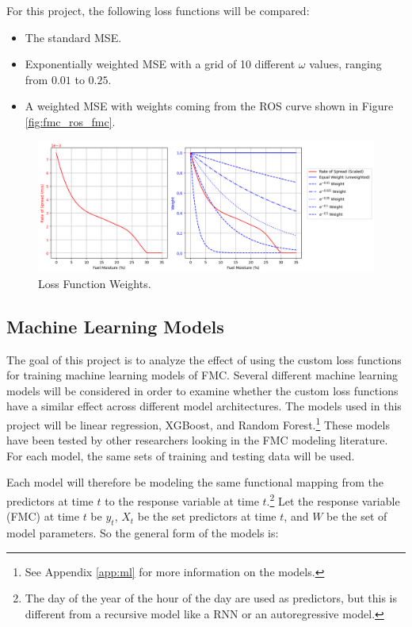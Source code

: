 \documentclass[11pt]{article}%
\begin{document}
For this project, the following loss functions will be compared:

\begin{itemize}
    \item The standard MSE.
    \item Exponentially weighted MSE with a grid of 10 different $\omega$ values, ranging from $0.01$ to $0.25$.
    \item A weighted MSE with weights coming from the ROS curve shown in Figure \ref{fig:fmc_ros_fmc}.
\end{itemize}

\begin{figure}[ht]
    \centering
    \includegraphics[width=1.1\textwidth]{images/weights.png}
    \caption{Loss Function Weights.}
    \label{fig:weights}
\end{figure}



\subsection{Machine Learning Models}

The goal of this project is to analyze the effect of using the custom loss functions for training machine learning models of FMC. Several different machine learning models will be considered in order to examine whether the custom loss functions have a similar effect across different model architectures. The models used in this project will be linear regression, XGBoost, and Random Forest.\footnote{See Appendix \ref{app:ml} for more information on the models.} These models have been tested by other researchers looking in the FMC modeling literature. \cite{Lee-2020-EFM,McCandless-2020-EWS, Schreck-2023-MLV} For each model, the same sets of training and testing data will be used. 

Each model will therefore be modeling the same functional mapping from the predictors at time $t$ to the response variable at time $t$.\footnote{The day of the year of the hour of the day are used as predictors, but this is different from a recursive model like a RNN or an autoregressive model.} Let the response variable (FMC) at time $t$ be $y_t$, $X_t$ be the set predictors at time $t$, and $W$ be the set of model parameters. So the general form of the models is:
\end{document}
